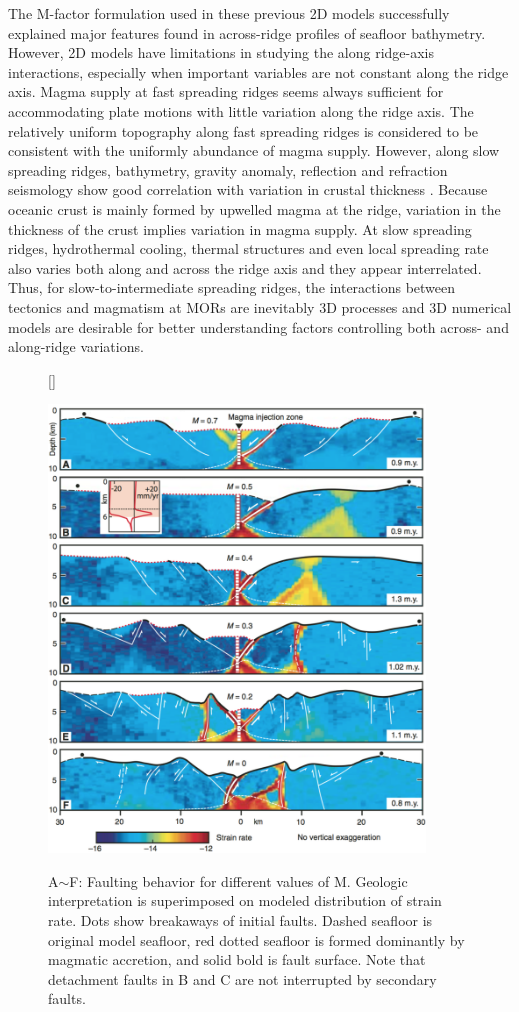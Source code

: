 \documentclass[12pt]{article}
\begin{document}
The M-factor formulation used in these previous 2D models successfully explained major features found in across-ridge profiles of seafloor bathymetry. However, 2D models have limitations in studying the along ridge-axis interactions, especially when important variables are not constant along the ridge axis. Magma supply at fast spreading ridges seems always sufficient for accommodating plate motions with little variation along the ridge axis. The relatively uniform topography along fast spreading ridges is considered to be consistent with the uniformly abundance of magma supply. However, along slow spreading ridges, bathymetry, gravity anomaly, reflection and refraction seismology show good correlation with variation in crustal thickness \citep{Ryan2009, Chen1999, Lin1990, Tolstoy1993}. Because oceanic crust is mainly formed by upwelled magma at the ridge, variation in the thickness of the crust implies variation in magma supply. At slow spreading ridges, hydrothermal cooling, thermal structures and even local spreading rate \citep{Baines2008} also varies both along and across the ridge axis and they appear interrelated. Thus, for slow-to-intermediate spreading ridges, the interactions between tectonics and magmatism at MORs are inevitably 3D processes and 3D numerical models are desirable for better understanding factors controlling both across- and along-ridge variations. 
\begin{figure}[H]
[\FBwidth]
{\caption{\small A$\sim$F: Faulting behavior for different values of M. Geologic interpretation is superimposed on modeled distribution of strain rate. Dots show breakaways of initial faults. Dashed seafloor is original model seafloor, red dotted seafloor is formed dominantly by magmatic accretion, and solid bold is fault surface. Note that detachment faults in B and C are not interrupted by secondary faults. \citep{Tucholke2008}}}
 {\includegraphics[width=10cm]{fig6_1.png}} 
 \label{fig6_1}
\end{figure}
\end{document}
